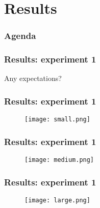 \section{Results}

\begin{frame}
\frametitle{Agenda}
\tableofcontents[currentsection]
\end{frame}


\begin{frame}
\frametitle{Results: experiment 1}
\LARGE Any expectations?
\end{frame}

\begin{frame}
\frametitle{Results: experiment 1}
\begin{figure}

	\texttt{[image: small.png]}

\end{figure}
\end{frame}

\begin{frame}
\frametitle{Results: experiment 1}
\begin{figure}

	\texttt{[image: medium.png]}

\end{figure}
\end{frame}

\begin{frame}
\frametitle{Results: experiment 1}
\begin{figure}

	\texttt{[image: large.png]}

\end{figure}
\end{frame}

